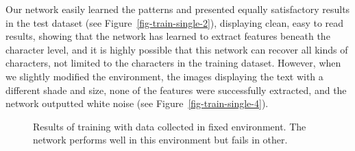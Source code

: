 Our network easily learned the patterns and presented equally satisfactory results in the test dataset (see Figure~\ref{fig-train-single-2}), displaying clean, easy to read results, showing that the network has learned to extract features beneath the character level, and it is highly possible that this network can recover all kinds of characters, not limited to the characters in the training dataset. However, when we slightly modified the environment, the images displaying the text with a different shade and size, none of the features were successfully extracted, and the network outputted white noise (see Figure~\ref{fig-train-single-4}).
 \begin{figure}
     \centering
        \caption{Results of training with data collected in fixed environment. The network performs well in this environment but fails in other.}
        \label{fig-train-single}
\end{figure}

